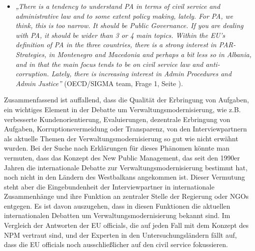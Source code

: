 \begin{itemize}[label={}]
\item \textit{„There is a tendency to understand PA in terms of civil service and administrative law and to some extent policy making, lately. For PA, we think, this is too narrow. It should be Public Governance. If you are dealing with PA, it should be wider than 3 or 4 main topics. Within the EU’s definition of PA in the three countries, there is a strong interest in PAR-Strategies, in Montenegro and Macedonia and perhaps a bit less so in Albania, and in that the main focus tends to be on civil service law and anti-corruption. Lately, there is increasing interest in Admin Procedures and Admin Justice”} (OECD/SIGMA team, Frage 1, Seite \pageref{sec:there}).
\end{itemize}
Zusammenfassend ist auffallend, dass die Qualität der Erbringung von Aufgaben, ein wichtiges Element in der Debatte um Verwaltungsmodernisierung, wie z.B. verbesserte Kundenorientierung, Evaluierungen, dezentrale Erbringung von Aufgaben, Korruptionsvermeidung oder Transparenz, von den Interviewpartnern als aktuelle Themen der Verwaltungsmodernisierung so gut wie nicht erwähnt wurden. Bei der Suche nach Erklärungen für dieses Phänomen könnte man vermuten, dass das Konzept des New Public Management, das seit den 1990er Jahren die internationale Debatte zur Verwaltungsmodernisierung bestimmt hat, noch nicht in den Ländern des Westbalkans angekommen ist. Dieser Vermutung steht aber die Eingebundenheit der Interviewpartner in internationale Zusammenhänge und ihre Funktion an zentraler Stelle der Regierung oder NGOs entgegen. Es ist davon auszugehen, dass in diesen Funktionen die aktuellen internationalen Debatten um Verwaltungsmodernisierung bekannt sind. Im Vergleich der Antworten der EU officials, die auf jeden Fall mit dem Konzept des NPM vertraut sind, und der Experten in den Untersuchungsländern fällt auf, dass die EU officials noch ausschließlicher auf den civil service fokussieren.

